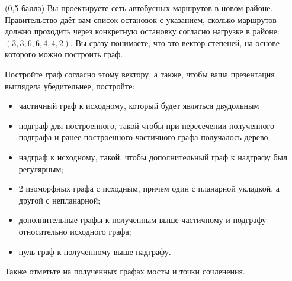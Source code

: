 \question
(0,5 балла) Вы проектируете сеть автобусных маршрутов в новом районе. Правительство даёт вам список остановок с указанием, сколько маршрутов должно проходить через конкретную остановку согласно нагрузке в районе: $(3, 3, 6, 6, 4, 4, 2)$. Вы сразу понимаете, что это вектор степеней, на основе которого можно построить граф.

Постройте граф согласно этому вектору, а также, чтобы ваша презентация выглядела убедительнее, постройте:

\begin{itemize}
\item частичный граф к исходному, который будет являться двудольным
\item подграф для построенного, такой чтобы при пересечении полученного подграфа и ранее построенного частичного графа получалось дерево;
\item надграф к исходному, такой, чтобы дополнительный граф к надграфу был регулярным;
\item 2 изоморфных графа с исходным, причем один с планарной укладкой, а другой с непланарной;
\item дополнительные графы к полученным выше частичному и подграфу относительно исходного графа;
\item нуль-граф к полученному выше надграфу.
\end{itemize}

Также отметьте на полученных графах мосты и точки сочленения.
